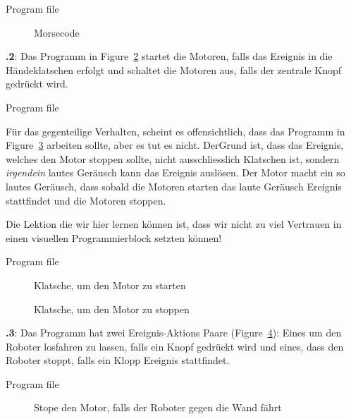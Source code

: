 \documentclass[12pt,a4paper]{article}
\begin{document}
{\raggedleft \hfill Program file }

\begin{figure}
\begin{center}
\caption{Morsecode}\label{fig.morse}
\end{center}
\end{figure}


\textbf{\thesection.2}:
Das Programm in Figure~\ref{fig.clap-to-start} startet die Motoren, falls das Ereignis in die Händeklatschen erfolgt und schaltet die Motoren aus, falls der zentrale Knopf gedrückt wird.

{\raggedleft \hfill Program file }

Für das gegenteilige Verhalten, scheint es offensichtlich, dass das Programm in Figure~\ref{fig.clap-to-stop} arbeiten sollte, aber es tut es nicht. DerGrund ist, dass das Ereignis, welches den Motor stoppen sollte, nicht ausschliesslich Klatschen ist, sondern \emph{irgendein} lautes Geräusch kann das Ereignis auslösen. Der Motor macht ein so lautes Geräusch, dass sobald die Motoren starten das laute Geräusch Ereignis stattfindet und die Motoren stoppen.

Die Lektion die wir hier lernen können ist, dass wir nicht zu viel Vertrauen in einen visuellen Programmierblock setzten können!

{\raggedleft \hfill Program file }

\begin{figure}
\begin{center}
\caption{Klatsche, um den Motor zu starten}
\label{fig.clap-to-start}
\end{center}
\end{figure}

\begin{figure}[hbt]
\begin{center}
\caption{Klatsche, um den Motor zu stoppen}\label{fig.clap-to-stop}
\end{center}
\end{figure}

\textbf{\thesection.3}:
Das Programm hat zwei Ereignis-Aktions Paare (Figure~\ref{fig.bump}): Eines um den Roboter losfahren zu lassen, falls ein Knopf gedrückt wird und eines, dass den Roboter stoppt, falls ein Klopp Ereignis stattfindet.

{\raggedleft \hfill Program file }

\begin{figure}[hbt]
\begin{center}
\caption{Stope den Motor, falls der Roboter gegen die Wand fährt}\label{fig.bump}
\end{center}
\end{figure}
\end{document}
